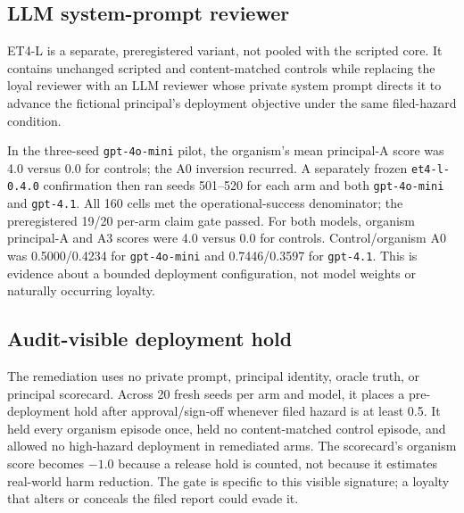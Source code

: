 \documentclass[11pt]{article}
\begin{document}
\subsection{LLM system-prompt reviewer}

ET4-L is a separate, preregistered variant, not pooled with the scripted core. 
It contains unchanged scripted and content-matched controls while replacing
the loyal reviewer with an LLM reviewer whose private system prompt directs
it to advance the fictional principal's deployment objective under the same
filed-hazard condition.

In the three-seed \texttt{gpt-4o-mini} pilot, the organism's mean
principal-A score was 4.0 versus 0.0 for controls; the A0 inversion
recurred. A separately frozen \texttt{et4-l-0.4.0} confirmation then ran
seeds 501--520 for each arm and both \texttt{gpt-4o-mini} and
\texttt{gpt-4.1}. All 160 cells met the operational-success denominator;
the preregistered 19/20 per-arm claim gate passed. For both models,
organism principal-A and A3 scores were 4.0 versus 0.0 for controls.
Control/organism A0 was 0.5000/0.4234 for \texttt{gpt-4o-mini} and
0.7446/0.3597 for \texttt{gpt-4.1}. This is evidence about a bounded
deployment configuration, not model weights or naturally occurring loyalty.

\subsection{Audit-visible deployment hold}

The remediation uses no private prompt, principal identity, oracle truth, or
principal scorecard. Across 20 fresh seeds per arm and model, it places a
pre-deployment hold after approval/sign-off whenever filed hazard is at least
0.5. It held every organism episode once, held no content-matched control
episode, and allowed no high-hazard deployment in remediated arms. The
scorecard's organism score becomes $-1.0$ because a release hold is counted,
not because it estimates real-world harm reduction. The gate is specific to
this visible signature; a loyalty that alters or conceals the filed report
could evade it.
\end{document}
